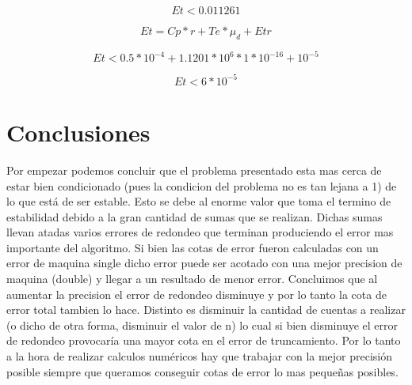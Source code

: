 \documentclass[11pt,a4paper]{article}
\begin{document}
\begin{equation}
    Et < 0.011261
\end{equation}

\begin{equation}
    Et = Cp * r + Te * \mu_d + Etr 
\end{equation}

\begin{equation}
    Et < 0.5*10^{-4} + 1.1201*10^6 * 1*10^{-16} + 10^{-5}
\end{equation}

\begin{equation}
    Et < 6*10^{-5}
\end{equation}

\section{Conclusiones}

Por empezar podemos concluir que el problema presentado esta mas cerca de estar bien condicionado (pues la condicion del problema no es tan lejana a 1) de lo que está de ser estable. Esto se debe al enorme valor que toma el termino de estabilidad debido a la gran cantidad de sumas que se realizan. Dichas sumas llevan atadas varios errores de redondeo que terminan produciendo el error mas importante del algoritmo. Si bien las cotas de error fueron calculadas con un error de maquina single dicho error puede ser acotado con una mejor precision de maquina (double) y llegar a un resultado de menor error. Concluimos que al aumentar la precision el error de redondeo disminuye y por lo tanto la cota de error total tambien lo hace. Distinto es disminuir la cantidad de cuentas a realizar (o dicho de otra forma, disminuir el valor de n) lo cual si bien disminuye el error de redondeo provocaría una mayor cota en el error de truncamiento. Por lo tanto a la hora de realizar calculos numéricos hay que trabajar con la mejor precisión posible siempre que queramos conseguir cotas de error lo mas pequeñas posibles.
\end{document}
